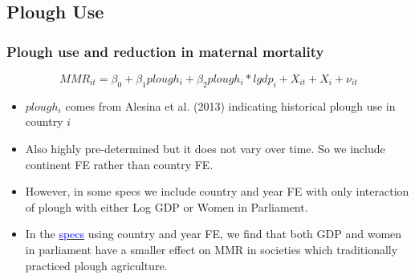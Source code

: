 \documentclass[10pt,letterpaper,subeqn]{beamer}
\begin{document}
\subsection{Plough Use}
\begin{frame}[label=PlowSlide]
\frametitle{Plough use and reduction in maternal mortality}
\begin{equation}
MMR_{it} = \beta_0 + \beta_1 plough_i + \beta_2 plough_i*lgdp_i + X_{it} + X_i  + \nu_{it} \nonumber
\end{equation}
\begin{itemize}
\setlength{\itemsep}{15pt}
  \item $plough_i$ comes from Alesina et al. (2013) indicating historical plough use in country $i$
	\item Also highly pre-determined but it does not vary over time. 	So we
        include continent FE rather than country FE.
	\item However, in some specs we include country and year FE with only interaction of plough with either Log GDP or Women in Parliament.		
	\item In the \hyperlink{PlowResults}{\textcolor{blue}{specs}}  using country and year FE, we find that both GDP and women in parliament have a smaller effect on MMR in societies which traditionally practiced plough agriculture. 	
\end{itemize}
\end{frame}
\end{document}
